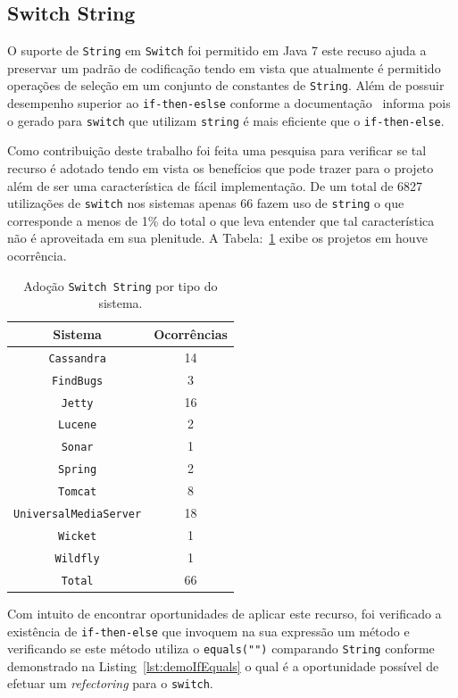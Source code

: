 \subsection{Switch String}

O suporte de \texttt{String} em \texttt{Switch} foi permitido em Java 7 este recuso ajuda a preservar um padrão de codificação tendo em vista que atualmente é permitido operações de seleção em um conjunto de constantes de \texttt{String}. Além de possuir desempenho superior ao \texttt{if-then-eslse} conforme a documentação~\cite{docSwitch} informa pois o gerado para \texttt{switch} que utilizam \texttt{string} é mais eficiente que o \texttt{if-then-else}.

Como contribuição deste trabalho foi feita uma pesquisa para verificar se tal recurso é adotado tendo em vista os benefícios que pode trazer para o projeto além de ser uma característica de fácil implementação. De um total de \num{6827} utilizações de \texttt{switch} nos sistemas apenas \num{66} fazem uso de \texttt{string} o que corresponde a menos de \num{1}\% do total o que leva entender que tal característica não é aproveitada em sua plenitude. A Tabela:~\ref{tab:adocaoSwitchString} exibe os projetos em houve ocorrência.


\begin{table}[ht] \footnotesize
	\centering
	\caption{Adoção \texttt{Switch String} por tipo do sistema.}
	\begin{tabular}{cc}
		\hline
		Sistema & Ocorrências \\ 
		\hline \hline
		\texttt{Cassandra} & 14 \\ 
		\texttt{FindBugs} & 3 \\ 
		\texttt{Jetty} & 16 \\
		\texttt{Lucene} & 2 \\
		\texttt{Sonar} & 1 \\
		\texttt{Spring} & 2 \\
		\texttt{Tomcat} & 8 \\
		\texttt{UniversalMediaServer} & 18 \\
		\texttt{Wicket} & 1 \\
		\texttt{Wildfly} & 1 \\	 \hline
		\texttt{Total} & 66 \\ \hline
	\end{tabular}
	\label{tab:adocaoSwitchString} %
\end{table}


Com intuito de encontrar oportunidades de aplicar este recurso, foi verificado a existência de \texttt{if-then-else} que invoquem na sua expressão um método e verificando se este método utiliza o \texttt{equals("")} comparando \texttt{String} conforme demonstrado na Listing~\ref{lst:demoIfEquals} o qual é a oportunidade possível de efetuar um  \textit{refectoring} para o \texttt{switch}.


